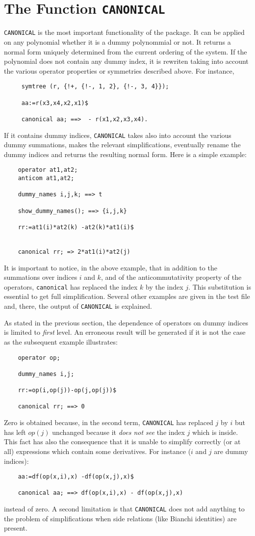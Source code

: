 \section{The Function {\tt CANONICAL}}
{\tt CANONICAL} is the most important functionality of the package.
It can be applied on any polynomial whether it is a dummy polynommial 
or not. It returns a normal form uniquely determined 
from the current ordering of the system.  
If the polynomial does not contain any dummy index, it is rewriten
taking into account the various operator properties or symmetries described 
above.
For instance, 
\begin{verbatim}
     symtree (r, {!+, {!-, 1, 2}, {!-, 3, 4}});

     aa:=r(x3,x4,x2,x1)$

     canonical aa; ==>  - r(x1,x2,x3,x4).
\end{verbatim}
If it contains dummy indices, {\tt CANONICAL} takes also into account the 
various dummy summations, makes the relevant simplifications, 
eventually rename the dummy indices  and returns the resulting normal form.
Here is a simple example:
\begin{verbatim}
    operator at1,at2;
    anticom at1,at2;

    dummy_names i,j,k; ==> t

    show_dummy_names(); ==> {i,j,k}

    rr:=at1(i)*at2(k) -at2(k)*at1(i)$
                     

    canonical rr; => 2*at1(i)*at2(j)
\end{verbatim}
It is important to notice, in the above example, that in addition to 
the summations over indices $i$ and $k$, and of the anticommutativity 
property of the operators, {\tt canonical} has replaced the index $k$
by the index $j$. This substitution is essential to get full simplification.
Several other examples are given in the test file and, there, the output
of {\tt CANONICAL} is explained.   

As stated in the previous section, the dependence of operators on dummy 
indices is limited to {\em first} level. An erroneous result
will be generated if it is not the case as the subsequent example 
illustrates:
\begin{verbatim}
    operator op;

    dummy_names i,j;

    rr:=op(i,op(j))-op(j,op(j))$

    canonical rr; ==> 0
\end{verbatim}
Zero is obtained because, in the second term, {\tt CANONICAL} has replaced 
$j$ by $i$ but has left $op(j)$ unchanged because it {\em does not see}
the index $j$ which is inside. This fact has also the consequence that 
it is unable to simplify correctly (or at all) expressions which 
contain some derivatives.
For instance ($i$ and $j$ are dummy indices):
\begin{verbatim}
    aa:=df(op(x,i),x) -df(op(x,j),x)$

    canonical aa; ==> df(op(x,i),x) - df(op(x,j),x)
\end{verbatim} 
instead of zero.
A second limitation is that {\tt CANONICAL} does not add anything to the
 problem of simplifications when side relations (like Bianchi identities) 
are present.
